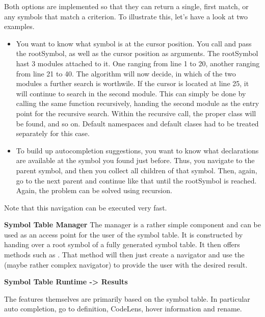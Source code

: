 Both options are implemented so that they can return a single, first match, or any symbols that match a criterion. To illustrate this, let's have a look at two examples.
\begin{itemize}
    \item You want to know what symbol is at the cursor position. You call  and pass the rootSymbol, as well as the cursor position as arguments. The rootSymbol hast 3 modules attached to it. One ranging from line 1 to 20, another ranging from line 21 to 40. The algorithm will now decide, in which of the two modules a further search is worthwile. If the cursor is located at line 25, it will continue to search in the second module. This can simply be done by calling the same function recursively, handing the second module as the entry point for the recursive search. Within the recursive call, the proper class will be found, and so on. Default namespaces and default clases had to be treated separately for this case.
    \item To build up autocompletion suggestions, you want to know what declarations are available at the symbol you found just before. Thus, you navigate to the parent symbol, and then you collect all children of that symbol. Then, again, go to the next parent and continue like that until the rootSymbol is reached. Again, the problem can be solved using recursion.
\end{itemize}
Note that this navigation can be executed very fast.

\textbf{Symbol Table Manager}
The manager is a rather simple component and can be used as an access point for the user of the symbol table. It is constructed by handing over a root symbol of a fully generated symbol table. It then offers methods such as . That method will then just create a navigator and use the (maybe rather complex navigator) to provide the user with the desired result. 





\textbf{Symbol Table Runtime -> Results}


The features themselves are primarily based on the symbol table.
In particular auto completion, go to definition, CodeLens, hover information and rename. \\

